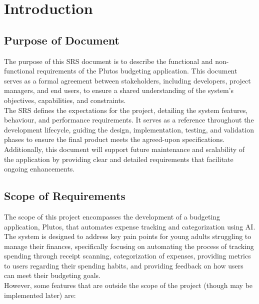 \documentclass[12pt]{article}
\begin{document}
\section{Introduction}


\subsection{Purpose of Document}

The purpose of this SRS document is to describe the functional and non-functional requirements of the Plutos budgeting application. This document serves as a formal agreement between stakeholders, including developers, project managers, and end users, to ensure a shared understanding of the system's objectives, capabilities, and constraints. \\

\noindent The SRS defines the expectations for the project, detailing the system features, behaviour, and performance requirements. It serves as a reference throughout the development lifecycle, guiding the design, implementation, testing, and validation phases to ensure the final product meets the agreed-upon specifications. Additionally, this document will support future maintenance and scalability of the application by providing clear and detailed requirements that facilitate ongoing enhancements.

\subsection{Scope of Requirements} 

The scope of this project encompasses the development of a budgeting application, Plutos, that automates expense tracking 
and categorization using AI. The system is designed to address key pain points for young adults struggling to manage their 
finances, specifically focusing on automating the process of tracking spending through receipt scanning, categorization of 
expenses, providing metrics to users regarding their spending habits, and providing feedback on how users can meet their 
budgeting goals.\\

\noindent However, some features that are outside the scope of the project (though may be implemented later) are: 
\end{document}
